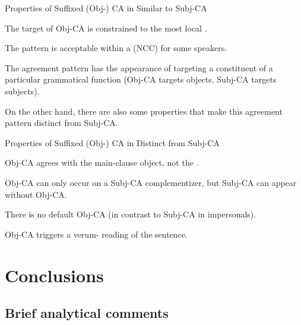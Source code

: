 \documentclass[output=paper
,newtxmath
,modfonts
,nonflat]{langsci/langscibook}
\begin{document}
\begin{exe}
\ex Properties of Suffixed (Obj-) CA in  Similar to Subj-CA
\begin{xlist}

\ex The target of Obj-CA is constrained to the most local . 


\ex The pattern is acceptable within a  (NCC) for some speakers.

\ex The agreement pattern has the appearance of targeting a constituent of a particular grammatical function (Obj-CA targets objects, Subj-CA targets subjects).

\end{xlist}
\end{exe}

\noindent On the other hand, there are also some properties that make this agreement pattern distinct from Subj-CA.

\begin{exe}
\ex Properties of Suffixed (Obj-) CA in  Distinct from Subj-CA
\begin{xlist}

\ex Obj-CA agrees with the main-clause object, not the . 

\ex Obj-CA can only occur on a Subj-CA complementizer, but Subj-CA can appear without Obj-CA. 

\ex There is no default Obj-CA (in contrast to Subj-CA in impersonals). 

\ex Obj-CA triggers a verum- reading of the sentence. 

\end{xlist}
\end{exe}




\section{Conclusions} \label{Conclusions}

\subsection{Brief analytical comments}
\end{document}
